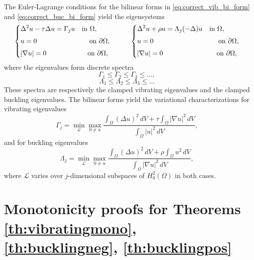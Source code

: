 \documentclass[11pt]{amsart}
\theoremstyle{definition}
\numberwithin{equation}{section}
\newcommand{\lapl}{\Delta}
\newcommand{\grad}{\nabla}
\begin{document}
The Euler-Lagrange conditions for the bilinear forms in \eqref{eq:correct_vib_bi_form} and \eqref{eq:correct_buc_bi_form} yield the eigensystems
\[
\left\{
\begin{aligned}
    & \lapl^2 u - \tau \lapl u = \Gamma_j u \quad \text{in } \Omega,\\[1mm]
    & u = 0 \hspace{2.7cm} \text{on } \partial \Omega,\\[1mm]
    & |\grad u| = 0 \hspace{2.12cm} \text{on } \partial \Omega,
\end{aligned}
\right.
\hspace{1cm}
\left\{
\begin{aligned}
    & \lapl^2 u + \rho u = \Lambda_j (-\lapl) u \quad \text{in } \Omega,\\[1mm]
    & u = 0 \hspace{3.34cm} \text{on } \partial \Omega,\\[1mm]
    & |\grad u| = 0 \hspace{2.76cm} \text{on } \partial \Omega,
\end{aligned}
\right.
\]
where the eigenvalues form discrete spectra
\[\Gamma_1 \leq \Gamma_2 \leq \Gamma_3 \leq \dots ,\]\[
\Lambda_1 \leq \Lambda_2 \leq \Lambda_3 \leq \dots\]
These spectra are respectively the clamped vibrating eigenvalues and the clamped buckling eigenvalues. The bilinear forms yield the variational characterizations for vibrating eigenvalues
\begin{equation}\label{eq:ultimate_final_vibrating_quotient}
\Gamma_j = \min_{\mathcal{L}} \max_{0 \neq u} \dfrac{\displaystyle \int_\Omega (\lapl u)^2 \, dV + \tau \int_\Omega |\grad u|^2 \, dV}{\displaystyle \int_\Omega |u|^2 \, dV},
\end{equation}
and for buckling eigenvalues
\begin{equation}\label{eq:ultimate_final_buckling_quotient}
\Lambda_j = \min_{\mathcal{L}} \max_{0 \neq u} \dfrac{\displaystyle \int_\Omega (\lapl u)^2 \, dV + \rho \int_\Omega u^2 \, dV}{\displaystyle \int_\Omega |\grad u|^2 \, dV},
\end{equation}
where $\mathcal{L}$ varies over $j$-dimensional subspaces of $H_0^2(\Omega)$ in both cases.
\section{Monotonicity proofs for Theorems \ref{th:vibratingmono}, \ref{th:bucklingneg}, \ref{th:bucklingpos}}
\end{document}
